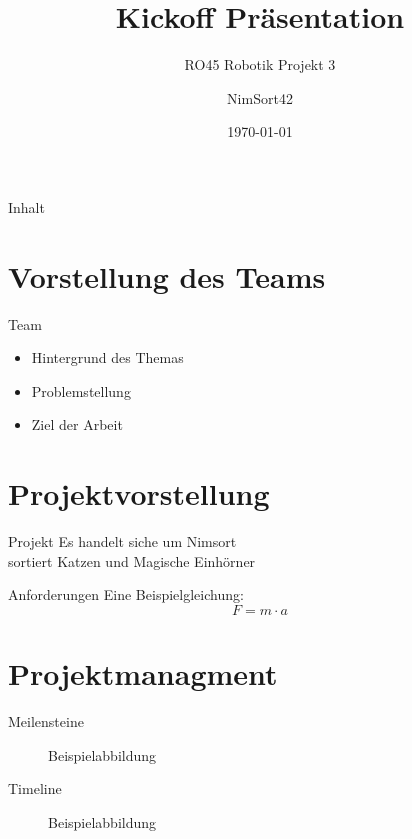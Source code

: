 \documentclass[aspectratio=169]{beamer}
\title[Kurztitel]{Kickoff Präsentation}
\subtitle{RO45 Robotik Projekt 3}
\author{NimSort42}
\institute{Hochschule Kempten}
\date{\today}
\begin{document}
	
	\begin{frame}
		\titlepage
	\end{frame}
	
	\begin{frame}{Inhalt}
		\tableofcontents
	\end{frame}

	\section{Vorstellung des Teams}
	
	\begin{frame}{Team}
		\begin{itemize}
			\item Hintergrund des Themas
			\item Problemstellung
			\item Ziel der Arbeit
		\end{itemize}
	\end{frame}
	
	\section{Projektvorstellung}
	
	\begin{frame}{Projekt}
		Es handelt siche um Nimsort\\
		sortiert Katzen und Magische Einhörner
	\end{frame}
	
	\begin{frame}{Anforderungen}
		Eine Beispielgleichung:
		\[
		F = m \cdot a
		\]
	\end{frame}
	
	\section{Projektmanagment}
	
	\begin{frame}{Meilensteine}
		\begin{figure}
			\centering
			\caption{Beispielabbildung}
		\end{figure}
	\end{frame}
	
	\begin{frame}{Timeline}
		\begin{figure}
			\centering
			\caption{Beispielabbildung}
		\end{figure}
	\end{frame}
	
\end{document}
